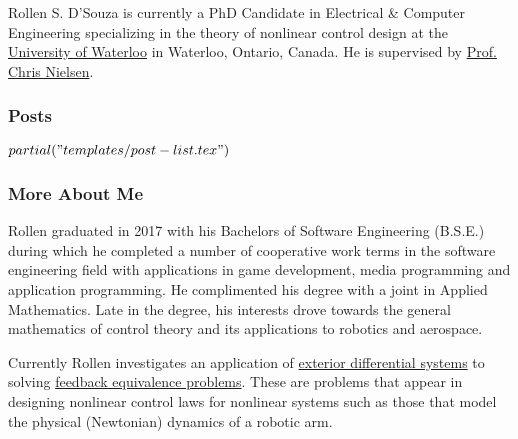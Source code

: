 Rollen S. D'Souza is currently a PhD Candidate in Electrical \& Computer Engineering specializing in the theory of nonlinear control design at the \href{https://uwaterloo.ca/}{University of Waterloo} in Waterloo, Ontario, Canada.
He is supervised by \href{https://ece.uwaterloo.ca/~cnielsen/}{Prof. Chris Nielsen}.

\subsubsection{Posts}
\begin{itemize}
  $partial("templates/post-list.tex")$
\end{itemize}

\subsubsection{More About Me}
Rollen graduated in 2017 with his Bachelors of Software Engineering (B.S.E.) during which he completed a number of cooperative work terms in the software engineering field with applications in game development, media programming and application programming.
He complimented his degree with a joint in Applied Mathematics.
Late in the degree, his interests drove towards the general mathematics of control theory and its applications to robotics and aerospace.

Currently Rollen investigates an application of \href{https://en.wikipedia.org/wiki/Differential_ideal}{exterior differential systems} to solving \href{https://en.wikipedia.org/wiki/Feedback_linearization}{feedback equivalence problems}.
These are problems that appear in designing nonlinear control laws for nonlinear systems such as those that model the physical (Newtonian) dynamics of a robotic arm.
